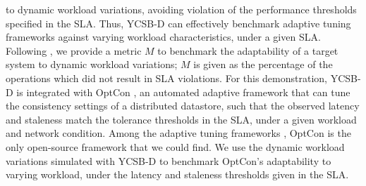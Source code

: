 \documentclass[conference]{IEEEtran}
\begin{document}
               to dynamic workload variations, avoiding violation of the performance thresholds specified in the SLA.
               Thus, YCSB-D can effectively benchmark adaptive tuning frameworks \cite{conf/wecwis/YuV00, Terry:2013:CSL:2517349.2522731, Ardekani:2014:SGC:2685048.2685077} %
                against varying workload characteristics, under a given SLA.
              Following \cite{Terry:2013:CSL:2517349.2522731}, we provide a metric \emph{$M$} to benchmark the adaptability of a target system to dynamic workload variations; $M$ is given as the percentage of the operations which did not result in SLA violations.
                For this demonstration, YCSB-D is integrated with OptCon \cite{OptCOnCCGRid2016}, an automated adaptive framework that can tune the consistency settings of a distributed datastore, such that the observed latency and staleness match the tolerance thresholds in the SLA, under a given workload and network condition.
                Among the adaptive tuning frameworks \cite{conf/wecwis/YuV00, Terry:2013:CSL:2517349.2522731, Ardekani:2014:SGC:2685048.2685077}, OptCon is the only open-source framework that we could find.
               We use the dynamic workload variations simulated with YCSB-D to benchmark OptCon's adaptability to varying workload, under the latency and staleness thresholds given in the SLA.
\end{document}
